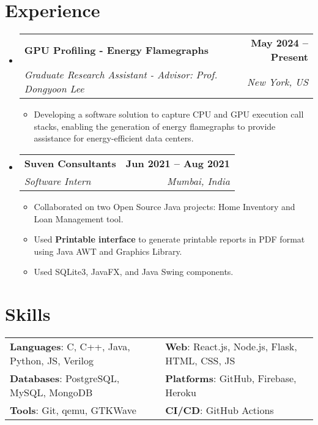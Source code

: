 \documentclass[letterpaper,11pt]{article}
\makeatletter
\newcommand{\resumeItem}[1]{
  \item\small{
    {#1 \vspace{-2pt}}
  }
}
\newcommand{\resumeSubheading}[4]{
  \vspace{-2pt}\item
    \begin{tabular*}{1.0\textwidth}[t]{l@{\extracolsep{\fill}}r}
      \vspace{-2pt}\textbf{#1} & \textbf{\small #2} \\
      \textit{\small#3} & \textit{\small #4} \\
    \end{tabular*}\vspace{-7pt}
}
\newcommand{\resumeSubHeadingListStart}{\begin{itemize}[leftmargin=0.0in, label={}]}
\newcommand{\resumeSubHeadingListEnd}{\end{itemize}}
\newcommand{\resumeItemListStart}{\begin{itemize}}
\newcommand{\resumeItemListEnd}{\end{itemize}\vspace{-5pt}}
\makeatother
\begin{document}
\section{Experience}
    \resumeSubHeadingListStart
    \vspace{-2pt}

            \resumeSubheading
            {GPU Profiling - Energy Flamegraphs}{May 2024 -- Present}
            {Graduate Research Assistant - Advisor: Prof. Dongyoon Lee}{New York, US}
            \resumeItemListStart
                \resumeItem{Developing a software solution to capture CPU and GPU execution call stacks, enabling the generation of energy flamegraphs to provide assistance for energy-efficient data centers.}
            \resumeItemListEnd
        \vspace{-3pt}
        
        \resumeSubheading
            {Suven Consultants}{Jun 2021 -- Aug 2021}
            {Software Intern}{Mumbai, India}
            \resumeItemListStart
                \resumeItem{Collaborated on two Open Source Java projects: Home Inventory and Loan Management tool.}
                \resumeItem{Used \textbf{Printable interface} to generate printable reports in PDF format using Java AWT and Graphics Library.}
                \resumeItem{Used SQLite3, JavaFX, and Java Swing components.}
            \resumeItemListEnd
        \vspace{-3pt}
    \resumeSubHeadingListEnd
\vspace{-18pt}



\section{Skills}
    \vspace{-4pt}
    \begin{itemize}[leftmargin=0.2in, label={}]
        {\item{
            \begin{tabular}{ l@{\hskip 0.2in} l }
                 \textbf{Languages}: C, C++, Java, Python, JS, Verilog & \textbf{Web}: React.js, Node.js, Flask, HTML, CSS, JS  \\ 
                 \textbf{Databases}: PostgreSQL, MySQL, MongoDB & \textbf{Platforms}: GitHub, Firebase, Heroku \\  
                 \textbf{Tools}: Git, qemu, GTKWave & \textbf{CI/CD}: GitHub Actions
            \end{tabular}
        }}
    \end{itemize}
\vspace{-22pt}
\end{document}
